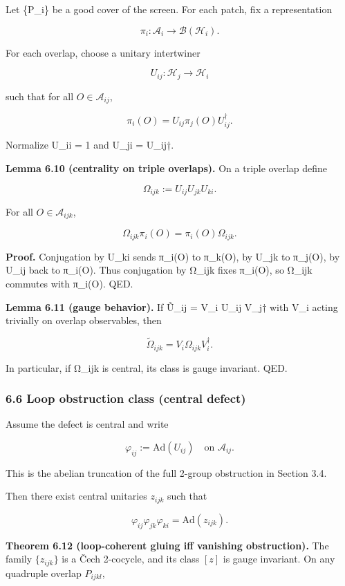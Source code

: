 Let \{P\_i\} be a good cover of the screen. For each patch, fix a representation

\[
\pi_i: \mathcal{A}_i \to \mathcal B(\mathcal H_i).
\]

For each overlap, choose a unitary intertwiner

\[
U_{ij}: \mathcal H_j \to \mathcal H_i
\]

such that for all \(O \in \mathcal{A}_{ij}\),

\[
\pi_i(O) = U_{ij} \pi_j(O) U_{ij}^\dagger.
\]

Normalize U\_ii = 1 and U\_ji = U\_ij†.

\textbf{Lemma 6.10 (centrality on triple overlaps).} On a triple overlap define

\[
\Omega_{ijk} := U_{ij} U_{jk} U_{ki}.
\]

For all \(O \in \mathcal{A}_{ijk}\),

\[
\Omega_{ijk} \pi_i(O) = \pi_i(O) \Omega_{ijk}.
\]

\textbf{Proof.} Conjugation by U\_ki sends π\_i(O) to π\_k(O), by U\_jk to π\_j(O), by U\_ij back to π\_i(O). Thus conjugation by Ω\_ijk fixes π\_i(O), so Ω\_ijk commutes with π\_i(O). QED.

\textbf{Lemma 6.11 (gauge behavior).} If \~{U}\_ij = V\_i U\_ij V\_j† with V\_i acting trivially on overlap observables, then

\[
\tilde{\Omega}_{ijk} = V_i \Omega_{ijk} V_i^\dagger.
\]

In particular, if Ω\_ijk is central, its class is gauge invariant. QED.

\subsubsection{6.6 Loop obstruction class (central defect)}\label{66-loop-obstruction-class-central-defect}

Assume the defect is central and write

\[
\varphi_{ij} := \mathrm{Ad}(U_{ij}) \quad \text{on } \mathcal{A}_{ij}.
\]

This is the abelian truncation of the full 2-group obstruction in Section 3.4.

Then there exist central unitaries \(z_{ijk}\) such that

\[
\varphi_{ij} \varphi_{jk} \varphi_{ki} = \mathrm{Ad}(z_{ijk}).
\]

\textbf{Theorem 6.12 (loop-coherent gluing iff vanishing obstruction).} The family \(\{z_{ijk}\}\) is a \v{C}ech 2-cocycle, and its class \([z]\) is gauge invariant. On any quadruple overlap \(P_{ijkl}\),

